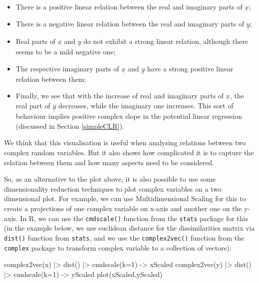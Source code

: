 \documentclass[
]{book}
\newenvironment{Shaded}{\begin{snugshade}}{\end{snugshade}}
\newcommand{\AttributeTok}[1]{\textcolor[rgb]{0.77,0.63,0.00}{#1}}
\newcommand{\DecValTok}[1]{\textcolor[rgb]{0.00,0.00,0.81}{#1}}
\newcommand{\FunctionTok}[1]{\textcolor[rgb]{0.00,0.00,0.00}{#1}}
\newcommand{\NormalTok}[1]{#1}
\newcommand{\OtherTok}[1]{\textcolor[rgb]{0.56,0.35,0.01}{#1}}
\newcommand{\SpecialCharTok}[1]{\textcolor[rgb]{0.00,0.00,0.00}{#1}}
\providecommand{\tightlist}{%
  \setlength{\itemsep}{0pt}\setlength{\parskip}{0pt}}
\begin{document}
\begin{itemize}
\tightlist
\item
  There is a positive linear relation between the real and imaginary parts of \(\underline{x}\);
\item
  There is a negative linear relation between the real and imaginary parts of \(\underline{y}\);
\item
  Real parts of \(\underline{x}\) and \(\underline{y}\) do not exhibit a strong linear relation, although there seems to be a mild negative one;
\item
  The respective imaginary parts of \(\underline{x}\) and \(\underline{y}\) have a strong positive linear relation between them;
\item
  Finally, we see that with the increase of real and imaginary parts of \(\underline{x}\), the real part of \(\underline{y}\) decreases, while the imaginary one increases. This sort of behaviour implies positive complex slope in the potential linear regression (discussed in Section \ref{simpleCLR}).
\end{itemize}

We think that this visualisation is useful when analysing relations between two complex random variables. But it also shows how complicated it is to capture the relation between them and how many aspects need to be considered.

So, as an alternative to the plot above, it is also possible to use some dimensionality reduction techniques to plot complex variables on a two dimensional plot. For example, we can use Multidimensional Scaling for this \citep[MDS,][]{Borg2005} to create a projections of one complex variable on x-axis and another one on the y-axis. In R, we can use the \texttt{cmdscale()} function from the \texttt{stats} package for this (in the example below, we use euclidean distance for the dissimilarities matrix via \texttt{dist()} function from \texttt{stats}, and we use the \texttt{complex2vec()} function from the \texttt{complex} package to transform complex variable to a collection of vectors):

\begin{Shaded}
\begin{Highlighting}[]
\FunctionTok{complex2vec}\NormalTok{(x) }\SpecialCharTok{|\textgreater{}} \FunctionTok{dist}\NormalTok{() }\SpecialCharTok{|\textgreater{}} \FunctionTok{cmdscale}\NormalTok{(}\AttributeTok{k=}\DecValTok{1}\NormalTok{) }\OtherTok{{-}\textgreater{}}\NormalTok{ xScaled}
\FunctionTok{complex2vec}\NormalTok{(y) }\SpecialCharTok{|\textgreater{}} \FunctionTok{dist}\NormalTok{() }\SpecialCharTok{|\textgreater{}} \FunctionTok{cmdscale}\NormalTok{(}\AttributeTok{k=}\DecValTok{1}\NormalTok{) }\OtherTok{{-}\textgreater{}}\NormalTok{ yScaled}
\FunctionTok{plot}\NormalTok{(xScaled,yScaled)}
\end{Highlighting}
\end{Shaded}
\end{document}
